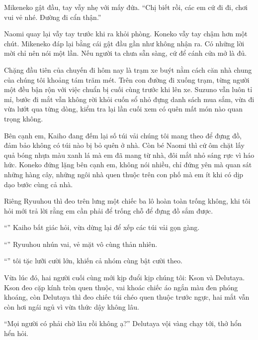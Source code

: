 ﻿\documentclass[../main.tex]{subfiles}
\begin{document}
Mikeneko gật đầu, tay vẫy nhẹ với mấy đứa. ``Chị biết rồi, các em cứ đi đi, chơi vui vẻ nhé. Đường đi cẩn thận.''

Naomi quay lại vẫy tay trước khi ra khỏi phòng. Koneko vẫy tay chậm hơn một chút. Mikeneko đáp lại bằng cái gật đầu gần như không nhận ra. Có những lời mời chỉ nên nói một lần. Nếu người ta chưa sẵn sàng, cứ để cánh cửa mở là đủ.

\ct


Chặng đầu tiên của chuyến đi hôm nay là trạm xe buýt nằm cách căn nhà chung của chúng tôi khoảng tám trăm mét. Trên con đường đi xuống trạm, từng người một đều bận rộn với việc chuẩn bị cuối cùng trước khi lên xe. Suzuno vẫn luôn tỉ mỉ, bước đi mắt vẫn không rời khỏi cuốn sổ nhỏ đựng danh sách mua sắm, vừa đi vừa lướt qua từng dòng, kiểm tra lại lần cuối xem có quên mất món nào quan trọng không.

Bên cạnh em, Kaiho đang đếm lại số túi vải chúng tôi mang theo để đựng đồ, đảm bảo không có túi nào bị bỏ quên ở nhà. Còn bé Naomi thì cứ ôm chặt lấy quả bóng nhựa màu xanh lá mà em đã mang từ nhà, đôi mắt nhỏ sáng rực vì háo hức. Koneko đứng lặng bên cạnh em, không nói nhiều, chỉ đứng yên mà quan sát những hàng cây, những ngôi nhà quen thuộc trên con phố mà em ít khi có dịp dạo bước cùng cả nhà.

Riêng Ryuuhou thì đeo trên lưng một chiếc ba lô hoàn toàn trống không, khi tôi hỏi mới trả lời rằng em cần phải để trống chỗ để đựng đồ sắm được.

``'' Kaiho bất giác hỏi, vừa dừng lại để xếp các túi vải gọn gàng.

``'' Ryuuhou nhún vai, vẻ mặt vô cùng thản nhiên.

``'' tôi tặc lưỡi cười lớn, khiến cả nhóm cùng bật cười theo.

Vừa lúc đó, hai người cuối cùng mới kịp đuổi kịp chúng tôi: Kson và Delutaya. Kson đeo cặp kính tròn quen thuộc, vai khoác chiếc áo ngắn màu đen phóng khoáng, còn Delutaya thì đeo chiếc túi chéo quen thuộc trước ngực, hai mắt vẫn còn hơi ngái ngủ vì vừa thức dậy không lâu.

``Mọi người có phải chờ lâu rồi không ạ?'' Delutaya vội vàng chạy tới, thở hổn hển hỏi.
\end{document}

